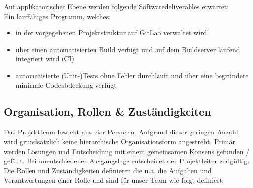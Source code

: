 Auf applikatorischer Ebene werden folgende Softwaredeliverables erwartet:\\
Ein lauffähiges Programm, welches:
\begin{itemize}
\item in der vorgegebenen Projektstruktur auf GitLab verwaltet wird.
\item über einen automatisierten Build verfügt und auf dem Buildserver laufend integriert wird (CI)
\item automatisierte (Unit-)Tests ohne Fehler durchläuft und über eine begründete minimale Codeabdeckung verfügt
\end{itemize}

\subsection{Organisation, Rollen \& Zuständigkeiten}
Das Projektteam besteht aus vier Personen. Aufgrund dieser geringen Anzahl wird grundsätzlich keine hierarchische Organisationsform angestrebt. Primär werden Lösungen und Entscheidung mit einem gemeinsamen Konsens gefunden / gefällt. Bei unentschiedener Ausgangslage entscheidet der Projektleiter endgültig.
Die Rollen und Zuständigkeiten definieren die u.a. die Aufgaben und Verantwortungen einer Rolle und sind für unser Team wie folgt definiert:
